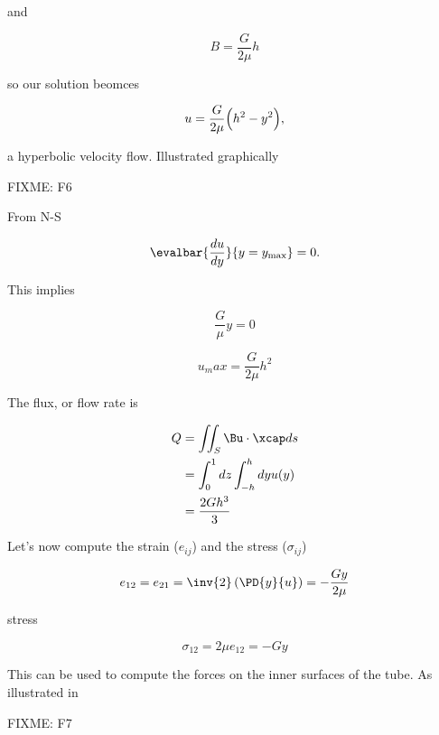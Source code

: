 and 

\begin{equation}\label{eqn:continuumL11:670}
B = \frac{G}{2 \mu} h
\end{equation}

so our solution beomces

\begin{equation}\label{eqn:continuumL11:690}
u = \frac{G}{2 \mu} \Bigl( h^2 - y^2 \Bigr),
\end{equation}

a hyperbolic velocity flow.  Illustrated graphically

FIXME: F6

From N-S

\begin{equation}\label{eqn:continuumL11:710}
\evalbar{\frac{du}{dy}}{y = y_{\text{max}}} = 0.
\end{equation}

This implies

\begin{equation}\label{eqn:continuumL11:830}
\frac{G}{\mu} y = 0
\end{equation}

\begin{equation}\label{eqn:continuumL11:850}
u_max = \frac{G}{2\mu} h^2
\end{equation}

The flux, or flow rate is

\begin{align*}
Q 
&= \iint_S \Bu \cdot \xcap ds \\
&= \int_0^1 dz \int_{-h}^h dy u(y) \\
&=
\frac{2 G h^3}{3}
\end{align*}

Let's now compute the strain ($e_{ij}$) and the stress ($\sigma_{ij}$)

\begin{equation}\label{eqn:continuumL11:730}
e_{12} = e_{21} = \inv{2} \left( \PD{y}{u} \right) = - \frac{G y}{2 \mu}
\end{equation}

stress

\begin{equation}\label{eqn:continuumL11:750}
\sigma_{12} = 2 \mu e_{12} = -G y
\end{equation}

This can be used to compute the forces on the inner surfaces of the tube.  As illustrated in

FIXME: F7

